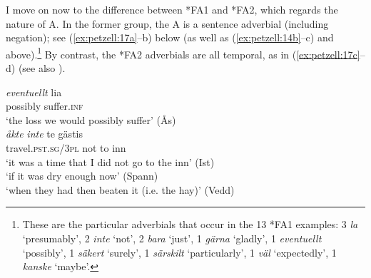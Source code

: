 \documentclass[output=paper,colorlinks,citecolor=brown,draft,draftmode]{langscibook}
\begin{document}
I move on now to the difference between *FA1 and *FA2, which regards the nature of A. In the former group, the A is a sentence adverbial (including negation); see (\ref{ex:petzell:17a}–b) below (as well as (\ref{ex:petzell:14b}–c) and  above).\footnote{These are the particular adverbials that occur in the 13 *FA1 examples: 3 \textit{la} `presumably’, 2 \textit{inte} ‘not’, 2 \textit{bara} ‘just’, 1 \textit{gärna} ‘gladly’, 1 \textit{eventuellt} ‘possibly’, 1 \textit{säkert} ‘surely’, 1 \textit{särskilt} ‘particularly’, 1 \textit{väl} ‘expectedly’, 1 \textit{kanske} ‘maybe’.} By contrast, the *FA2 adverbials are all temporal, as in (\ref{ex:petzell:17c}–d) (see also ).{}


\ea\label{ex:petzell:17}
\gll     \textit{{eventuellt}}    lia   \\
    possibly      suffer.\textsc{inf}  \\
\glt  `the loss we would possibly suffer’ (Ås)  \\

\gll     \textit{{åkte}} \textit{{inte}}    te  gästis      \\
    travel.\textsc{pst.sg}/3\textsc{pl}  not    to  inn   \\
\glt `it was a time that I did not go to the inn’ (Ist)  \\

\glt   `if it was dry enough now’ (Spann)  \\
\glt `when they had then beaten it (i.e. the hay)’ (Vedd)
\z
\z
\end{document}
